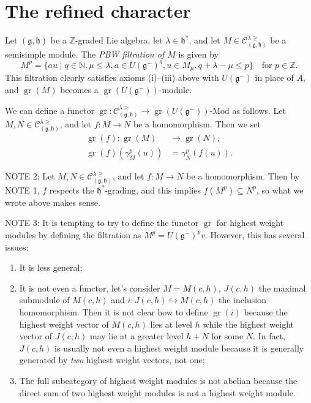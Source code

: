 \documentclass[a4paper, 12pt, reqno]{amsart}
\DeclareMathOperator{\gr}{gr}
\begin{document}
\section{The refined character}
\label{sec:refined-character}

Let $(\mathfrak{g}, \mathfrak{h})$ be a $\mathbb{Z}$-graded Lie algebra, let $\lambda \in \mathfrak{h}^*$, and let $M \in \mathcal{C}^{\lambda \ge}_{(\mathfrak{g}, \mathfrak{h})}$ be a semisimple module.
The \emph{PBW filtration of $M$} is given by
\begin{equation*}
  M^p = \{au \mid q \in \mathbb{N}, \mu \le \lambda, a \in U(\mathfrak{g}^-)^q, u \in M_{\mu}, q + \lambda - \mu \le p\} \quad \text{for $p \in \mathbb{Z}$}.
\end{equation*}
This filtration clearly satisfies axioms (i)--(iii) above with $U(\mathfrak{g}^-)$ in place of $A$, and $\gr(M)$ becomes a $\gr(U(\mathfrak{g^-}))$-module.

We can define a functor $\gr: \mathcal{C}^{\lambda \ge}_{(\mathfrak{g}, \mathfrak{h})} \to \gr(U(\mathfrak{g}^-))\text{-Mod}$ as follows.
Let $M, N \in \mathcal{C}^{\lambda \ge}_{(\mathfrak{g}, \mathfrak{h})}$, and let $f: M \to N$ be a homomorphism.
Then we set
\begin{align*}
  \gr(f): \gr(M) &\to \gr(N), \\
  \gr(f)(\gamma_M^p(u)) &= \gamma_N^p(f(u)).
\end{align*}

NOTE 2: Let $M, N \in \mathcal{C}^{\lambda \ge}_{(\mathfrak{g}, \mathfrak{h})}$, and let $f: M \to N$ be a homomorphism.
Then by NOTE 1, $f$ respects the $\mathfrak{h}^*$-grading, and this implies $f(M^p) \subseteq N^p$, so what we wrote above makes sense.

NOTE 3: It is tempting to try to define the functor $\gr$ for highest weight modules by defining the filtration as $M^p = U(\mathfrak{g}^-)^pv$.
However, this has several issues:
\begin{enumerate}
\item It is less general;
\item It is not even a functor, let's consider $M = M(c, h)$, $J(c, h)$ the maximal submodule of $M(c, h)$ and $i: J(c, h) \hookrightarrow M(c, h)$ the inclusion homomorphism.
  Then it is not clear how to define $\gr(i)$ because the highest weight vector of $M(c, h)$ lies at level $h$ while the highest weight vector of $J(c, h)$ may lie at a greater level $h + N$ for some $N$.
  In fact, $J(c, h)$ is usually not even a highest weight module because it is generally generated by \emph{two} highest weight vectors, not one;
\item The full subcategory of highest weight modules is not abelian because the direct sum of two highest weight modules is not a highest weight module.
\end{enumerate}
\end{document}
